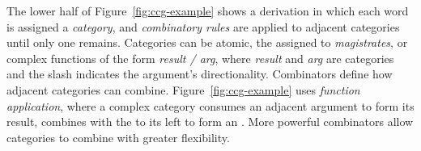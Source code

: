 The lower half of Figure~\ref{fig:ccg-example} shows a \ccg derivation
\parencite{Steedman:2000} in which each word is assigned a {\em category}, and
{\em combinatory rules} are applied to adjacent categories until only one
remains.  Categories can be atomic, \myeg the  assigned to
\textit{magistrates}, or complex functions of the form {\em result / arg}, where
{\em result} and {\em arg} are categories and the slash indicates the argument's
directionality.  Combinators define how adjacent categories can combine.
Figure~\ref{fig:ccg-example} uses {\em function application}, where a complex
category consumes an adjacent argument to form its result, \myeg {} combines with the  to its left to form an .  More
powerful combinators allow categories to combine with greater flexibility.

